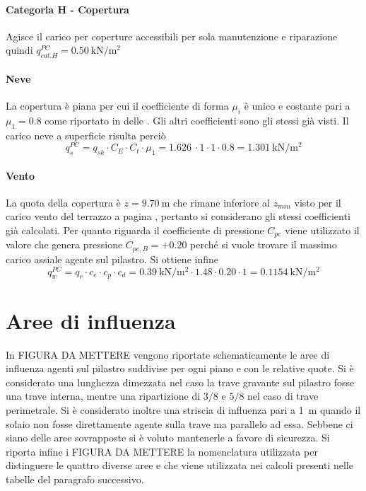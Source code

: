 \paragraph*{Categoria H - Copertura} Agisce il carico per coperture accessibili per sola manutenzione e riparazione quindi $q_{cat. H}^{PC} = \SI{0.50}{\kilo\newton\per\square\meter}$ 
\paragraph*{Neve} La copertura è piana per cui il coefficiente di forma $\mu_i$ è unico e costante pari a $\mu_1=0.8$ come riportato in  delle . 
Gli altri coefficienti sono gli stessi già visti.
Il carico neve a superficie risulta perciò
\[
	q_s^{PC} = q_{sk} \cdot C_E \cdot C_t \cdot \mu_1 = \SI{1.626}{} \cdot 1 \cdot 1 \cdot 0.8 = \SI{1.301}{\kilo\newton\per\square\meter}
\]
\paragraph*{Vento} La quota della copertura è $z=\SI{9.70}{\meter}$ che rimane inferiore al $z_{min}$ visto per il carico vento del terrazzo a pagina \pageref{cap:ventoTerrazzo}, pertanto si considerano gli stessi coefficienti già calcolati.
Per quanto riguarda il coefficiente di pressione $C_{pe}$ viene utilizzato il valore che genera pressione $C_{pe,B}=+0.20$ perché si vuole trovare il massimo carico assiale agente sul pilastro.
Si ottiene infine
\[
	q_w^{PC} = q_r \cdot c_e \cdot c_p \cdot c_d = \SI{0.39}{\kilo\newton\per\square\meter}\cdot 1.48 \cdot  0.20 \cdot 1= \SI{0.1154}{\kilo\newton\per\square\meter}
\]
\section{Aree di influenza}
In FIGURA DA METTERE vengono riportate schematicamente le aree di influenza agenti sul pilastro suddivise per ogni piano e con le relative quote. 
Si è considerato una lunghezza dimezzata nel caso la trave gravante sul pilastro fosse una trave interna, mentre una ripartizione di $3/8$ e $5/8$ nel caso di trave perimetrale. 
Si è considerato inoltre una striscia di influenza pari a \SI{1}{\meter} quando il solaio non fosse direttamente agente sulla trave ma parallelo ad essa. 
Sebbene ci siano delle aree sovrapposte si è voluto mantenerle a favore di sicurezza.
Si riporta infine i FIGURA DA METTERE la nomenclatura utilizzata per distinguere le quattro diverse aree e che viene utilizzata nei calcoli presenti nelle tabelle del paragrafo successivo.

